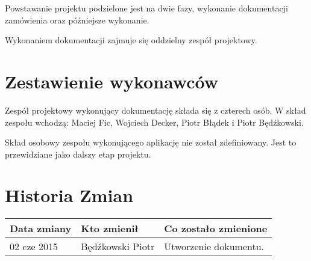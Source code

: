 Powstawanie projektu podzielone jest na dwie fazy, wykonanie dokumentacji zamówienia oraz późniejsze wykonanie.

\bigskip
\noindent Wykonaniem dokumentacji zajmuje się oddzielny zespół projektowy.

\section{Zestawienie wykonawców}

Zespół projektowy wykonujący dokumentację składa się z czterech osób. W skład zespołu wchodzą: Maciej Fic, Wojciech Decker, Piotr Błądek i Piotr Będźkowski.

\bigskip
\noindent Skład osobowy zespołu wykonującego aplikację nie został zdefiniowany. Jest to przewidziane jako dalszy etap projektu.

\section{Historia Zmian}

\begin{tabularx}{\textwidth}{X|l|X}
\hline
\textbf{Data zmiany} & \textbf{Kto zmienił} & \textbf{Co zostało zmienione} \\ \hline
02 cze 2015          & Będźkowski Piotr     & Utworzenie dokumentu.           \\ \hline
\end{tabularx}
